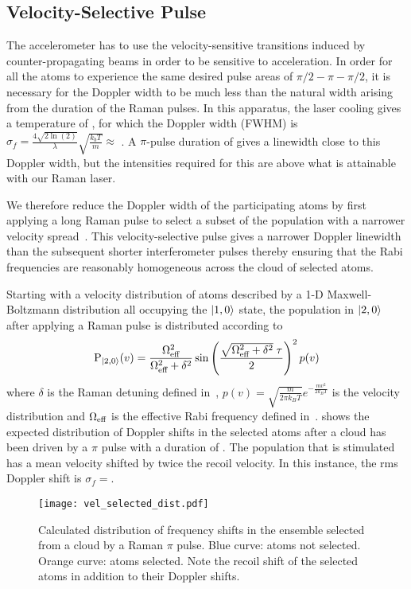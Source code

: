 \subsection{Velocity-Selective Pulse}\label{subsec:vel_select}
The accelerometer has to use the velocity-sensitive transitions
induced by counter-propagating beams in order to be sensitive to
acceleration. In order for all the atoms to experience the same
desired pulse areas of $\pi/2-\pi-\pi/2$, it is necessary for the
Doppler width to be much less than the natural width arising from the
duration of the Raman pulses. In this apparatus, the laser cooling
gives a temperature of , for which the Doppler
width (FWHM) is \(\sigma_f = \frac{4 \sqrt{2 \ln(2)}}{\lambda}\sqrt{\frac{k_b T}{m}}
\approx\) . 
A $\pi$-pulse duration of  gives a
linewidth close
to this Doppler width, but the intensities required for this are above
what is attainable with our Raman laser. 
\par\noindent
We therefore reduce the Doppler width of the participating atoms
by first applying a long Raman pulse to select a subset of the population
with a narrower velocity spread~\cite{Moler1992}. This
velocity-selective pulse gives a narrower Doppler linewidth than the
subsequent shorter
interferometer pulses thereby ensuring that the Rabi frequencies are
reasonably homogeneous across the cloud of selected atoms.
\par\noindent 
Starting with a velocity distribution of atoms
described by a 1-D Maxwell-Boltzmann distribution all occupying the
\(\ket{1,0}\) state, the
population in \(\ket{2,0}\) after applying a Raman pulse is
distributed according to
\begin{equation}
  \text{P}_{\ket{2,0}}(v) = \frac{\Omega_\textnormal{eff}^2}{\Omega_\textnormal{eff}^2 + \delta^2}
  \sin\left(\frac{\sqrt{\Omega_\textnormal{eff}^2+\delta^2}\;\tau}{2}\right)^2 p(v)
  \label{eq:vel_selected_dist}
\end{equation}
where \(\delta\) is the Raman detuning defined
in~, \(p(v) = \sqrt{\frac{m}{2\pi
k_B T}} e^{-\frac{m v^2}{2 k_B T}}\) is the velocity distribution and
\(\Omega_\textnormal{eff}\) is the effective Rabi frequency defined
in~. 
shows the expected
distribution of Doppler shifts in the selected atoms after a
 cloud has been driven by a $\pi$ pulse with a duration of
.
The population that is stimulated
has a mean velocity shifted by twice the recoil velocity. In this
instance, the rms
Doppler shift is \(\sigma_f
=\).
\begin{figure}[htpb!]
  \centering
  \texttt{[image: vel\_selected\_dist.pdf]}
  \caption[Simulated velocity distribution after a Raman $\pi$
  pulse.]{Calculated distribution of frequency shifts in the ensemble
    selected from a 
  cloud by a  Raman \(\pi\)
pulse. Blue curve: atoms not selected. Orange curve: atoms selected.
Note the recoil shift of the selected atoms in addition to their
Doppler shifts. }
  \label{fig:vel_selected_dist}
\end{figure}

